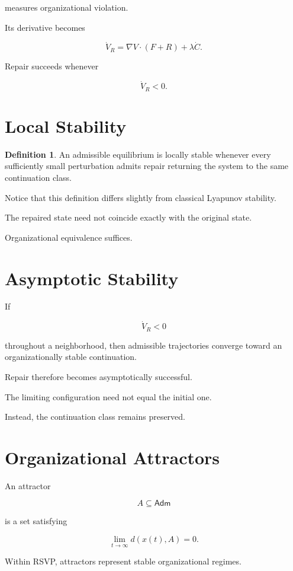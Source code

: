 \documentclass[11pt,oneside]{book}
\numberwithin{equation}{chapter}
\theoremstyle{definition}
\newtheorem{definition}{Definition}[chapter]
\theoremstyle{plain}
\newcommand{\Adm}{\mathsf{Adm}}
\begin{document}
measures organizational violation.

Its derivative becomes

\[
\dot V_R
=
\nabla V
\cdot
(F+R)
+
\lambda
\dot C.
\]

Repair succeeds whenever

\[
\dot V_R
<
0.
\]

\section{Local Stability}

\begin{definition}
An admissible equilibrium is locally stable whenever every sufficiently
small perturbation admits repair returning the system to the same
continuation class.
\end{definition}

Notice that this definition differs slightly from classical Lyapunov
stability.

The repaired state need not coincide exactly with the original state.

Organizational equivalence suffices.

\section{Asymptotic Stability}

If

\[
\dot V_R
<
0
\]

throughout a neighborhood, then admissible trajectories converge toward an
organizationally stable continuation.

Repair therefore becomes asymptotically successful.

The limiting configuration need not equal the initial one.

Instead, the continuation class remains preserved.

\section{Organizational Attractors}

An attractor

\[
A
\subseteq
\Adm
\]

is a set satisfying

\[
\lim_{t\rightarrow\infty}
d(x(t),A)
=
0.
\]

Within RSVP, attractors represent stable organizational regimes.
\end{document}
